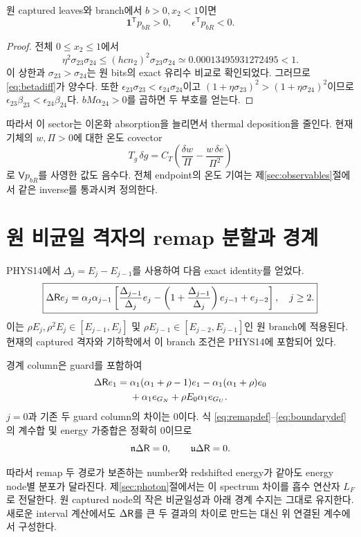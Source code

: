 \begin{proposition}\label{prop:birthsign}
원 captured leaves와 branch에서 $b>0,x_2<1$이면
\begin{equation}
\boxed{\boldsymbol1^{\mathsf T}p_{bR}>0,\qquad
\epsilon^{\mathsf T}p_{bR}<0.}
\label{eq:birthsign}
\end{equation}
\end{proposition}
\begin{proof}
전체 $0\le x_2\le1$에서
\[
\eta^2\sigma_{23}\sigma_{24}
\le(hcn_2)^2\sigma_{23}\sigma_{24}
\simeq0.00013495931272495<1.
\]
이 상한과 $\sigma_{23}>\sigma_{24}$는 원 bits의 exact 유리수 비교로 확인되었다. 그러므로 \eqref{eq:betadiff}가 양수다. 또한
$\epsilon_{23}\sigma_{23}<\epsilon_{24}\sigma_{24}$이고
$(1+\eta\sigma_{23})^2>(1+\eta\sigma_{24})^2$이므로
$\epsilon_{23}\beta_{23}<\epsilon_{24}\beta_{24}$다.
$bM\alpha_{24}>0$를 곱하면 두 부호를 얻는다.
\end{proof}

따라서 이 sector는 이온화 absorption을 늘리면서 thermal deposition을 줄인다. 현재 기체의 $w,\Pi>0$에 대한 온도 covector
\begin{equation}
T_g\,\delta g=C_T\left(\frac{\delta w}{\Pi}
-\frac{w\,\delta e}{\Pi^2}\right)
\end{equation}
로 $\mathsf Vp_{bR}$를 사영한 값도 음수다. 전체 endpoint의 온도 기여는 제\ref{sec:observables}절에서 같은 inverse를 통과시켜 정의한다.\cite{photon_theory,checks}

\section{원 비균일 격자의 remap 분할과 경계}\label{sec:remap}
PHYS14에서 $\Delta_j=E_j-E_{j-1}$를 사용하여 다음 exact identity를 얻었다.
\begin{equation}
\boxed{
\Delta\mathsf R e_j
=\alpha_j\alpha_{j-1}
\left[
\frac{\Delta_{j-1}}{\Delta_j}e_j
-\left(1+\frac{\Delta_{j-1}}{\Delta_j}\right)e_{j-1}
+e_{j-2}
\right],\quad j\ge2.
}
\label{eq:remapdef}
\end{equation}
이는 $\rho E_j,\rho^2E_j\in[E_{j-1},E_j]$ 및
$\rho E_{j-1}\in[E_{j-2},E_{j-1}]$인 원 branch에 적용된다.
현재의 captured 격자와 기하학에서 이 branch 조건은 PHYS14에 포함되어 있다.

경계 column은 guard를 포함하여
\begin{align}
\Delta\mathsf R e_1={}&\alpha_1(\alpha_1+\rho-1)e_1
-\alpha_1(\alpha_1+\rho)e_0\nonumber\\
&+\alpha_1e_{G_N}+\rho E_0\alpha_1e_{G_U}.
\label{eq:boundarydef}
\end{align}
$j=0$과 기존 두 guard column의 차이는 0이다. 식
\eqref{eq:remapdef}--\eqref{eq:boundarydef}의 계수합 및 energy 가중합은 정확히 0이므로
\begin{equation}
\mathfrak n\Delta\mathsf R=0,\qquad \mathfrak u\Delta\mathsf R=0.
\label{eq:zero_moments}
\end{equation}

따라서 remap 두 경로가 보존하는 number와 redshifted energy가 같아도 energy node별 분포가 달라진다. 제\ref{sec:photon}절에서는 이 spectrum 차이를 흡수 연산자 $L_F$로 전달한다. 원 captured node의 작은 비균일성과 아래 경계 수지는 그대로 유지한다. 새로운 interval 계산에서도 $\Delta\mathsf R$를 큰 두 결과의 차이로 만드는 대신 위 연결된 계수에서 구성한다.\cite{phys14,photon_theory}

